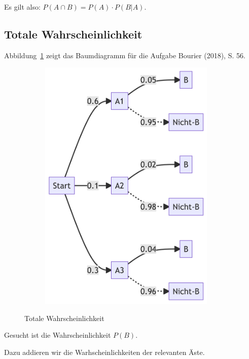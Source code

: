 \documentclass[
  a4paper,
  DIV=11]{scrreprt}
\theoremstyle{definition}
\theoremstyle{remark}
\begin{document}
Es gilt also: \(P(A\cap B) = P(A) \cdot P(B|A)\).

\hypertarget{totale-wahrscheinlichkeit}{%
\subsection{Totale Wahrscheinlichkeit}\label{totale-wahrscheinlichkeit}}

Abbildung~\ref{fig-tot-wskt} zeigt das Baumdiagramm für die Aufgabe
Bourier (2018), S. 56.

\begin{figure}

{\centering 

\begin{figure}[H]

{\centering \includegraphics[width=3.34in,height=4.86in]{./Wskt_files/figure-latex/mermaid-figure-3.png}

}

\end{figure}

}

\caption{\label{fig-tot-wskt}Totale Wahrscheinlichkeit}

\end{figure}

Gesucht ist die Wahrscheinlichkeit \(P(B)\).

Dazu addieren wir die Warhscheinlichkeiten der relevanten Äste.
\end{document}
